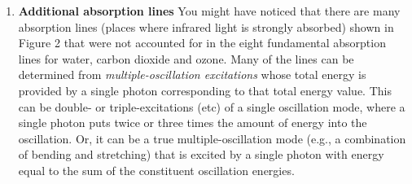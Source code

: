 \documentclass[12pt]{article}
\begin{document}
\begin{enumerate}
\item {\bf Additional absorption lines}  You might have noticed that there are many absorption lines (places where infrared light is strongly absorbed) shown in Figure 2 that were not accounted for in the eight fundamental absorption lines for water, carbon dioxide and ozone.  Many of the lines can be determined from {\em multiple-oscillation excitations} whose total energy is provided by a single photon corresponding to that total energy value.  This can be double- or triple-excitations (etc) of a single oscillation mode, where a single photon puts twice or three times the amount of energy into the oscillation. Or, it can be a true multiple-oscillation mode (e.g., a combination of bending and stretching) that is excited by a single photon with energy equal to the sum of the constituent oscillation energies.\\[-6pt]


\end{enumerate}
\end{document}

